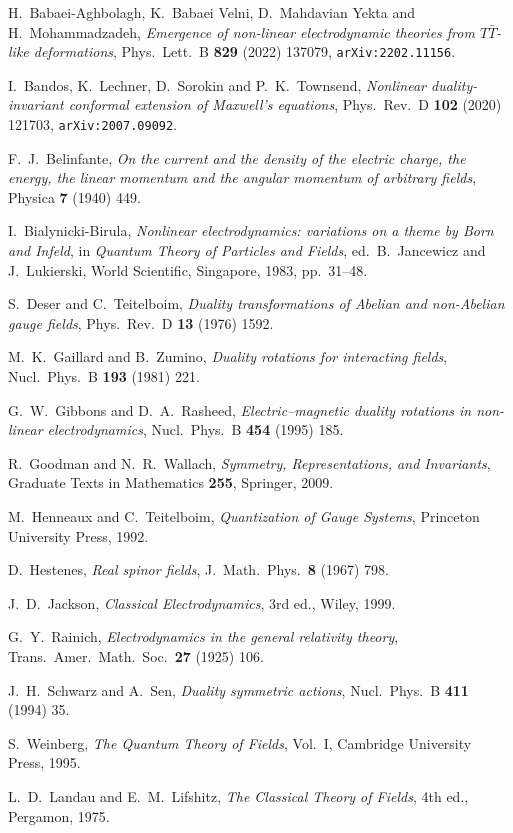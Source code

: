  H.~Babaei-Aghbolagh, K.~Babaei Velni, D.~Mahdavian Yekta and H.~Mohammadzadeh, \emph{Emergence of non-linear
electrodynamic theories from $T\bar T$-like deformations}, Phys.~Lett.~B \textbf{829} (2022) 137079, \texttt{arXiv:2202.11156}.

 I.~Bandos, K.~Lechner, D.~Sorokin and P.~K.~Townsend, \emph{Nonlinear duality-invariant conformal
extension of Maxwell's equations}, Phys.~Rev.~D \textbf{102} (2020) 121703, \texttt{arXiv:2007.09092}.

 F.~J.~Belinfante, \emph{On the current and the density of the electric charge, the energy, the linear momentum and the
angular momentum of arbitrary fields}, Physica \textbf{7} (1940) 449.

 I.~Bialynicki-Birula, \emph{Nonlinear electrodynamics: variations on a theme by Born and Infeld}, in
\emph{Quantum Theory of Particles and Fields}, ed.~B.~Jancewicz and J.~Lukierski, World Scientific, Singapore, 1983, pp.~31--48.

 S.~Deser and C.~Teitelboim, \emph{Duality transformations of Abelian and non-Abelian gauge fields}, Phys.~Rev.~D \textbf{13} (1976) 1592.

 M.~K.~Gaillard and B.~Zumino, \emph{Duality rotations for interacting fields}, Nucl.~Phys.~B \textbf{193} (1981) 221.

 G.~W.~Gibbons and D.~A.~Rasheed, \emph{Electric--magnetic duality rotations in non-linear electrodynamics}, Nucl.~Phys.~B \textbf{454} (1995) 185.

 R.~Goodman and N.~R.~Wallach, \emph{Symmetry, Representations, and Invariants}, Graduate Texts in Mathematics \textbf{255}, Springer, 2009.

 M.~Henneaux and C.~Teitelboim, \emph{Quantization of Gauge Systems}, Princeton University Press, 1992.

 D.~Hestenes, \emph{Real spinor fields}, J.~Math.~Phys.~\textbf{8} (1967) 798.

 J.~D.~Jackson, \emph{Classical Electrodynamics}, 3rd ed., Wiley, 1999.

 G.~Y.~Rainich, \emph{Electrodynamics in the general relativity theory}, Trans.~Amer.~Math.~Soc.~\textbf{27} (1925) 106.

 J.~H.~Schwarz and A.~Sen, \emph{Duality symmetric actions}, Nucl.~Phys.~B \textbf{411} (1994) 35.

 S.~Weinberg, \emph{The Quantum Theory of Fields}, Vol.~I, Cambridge University Press, 1995.

 L.~D.~Landau and E.~M.~Lifshitz, \emph{The Classical Theory of Fields}, 4th ed., Pergamon, 1975.
